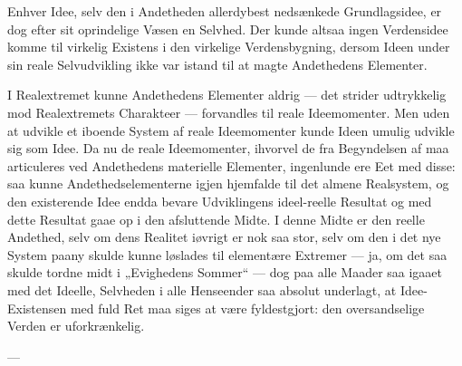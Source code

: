 \documentclass[12pt]{book}
\begin{document}
Enhver Idee, selv den i Andetheden allerdybest nedsænkede Grundlagsidee, er dog efter sit oprindelige Væsen en Selvhed. Der kunde altsaa ingen Verdensidee komme til virkelig Existens i den virkelige Verdensbygning, dersom Ideen under sin reale Selvudvikling ikke var istand til at magte Andethedens Elementer.

I Realextremet kunne Andethedens Elementer aldrig --- det strider udtrykkelig mod Realextremets Charakteer --- forvandles til reale Ideemomenter. Men uden at udvikle et iboende System af reale Ideemomenter kunde Ideen umulig udvikle sig som Idee. Da nu de reale Ideemomenter, ihvorvel de fra Begyndelsen af maa articuleres ved Andethedens materielle Elementer, ingenlunde ere Eet med disse: saa kunne Andethedselementerne igjen hjemfalde til det almene Realsystem, og den existerende Idee endda bevare Udviklingens ideel-reelle Resultat og med dette Resultat gaae op i den afsluttende Midte. I denne Midte er den reelle Andethed, selv om dens Realitet iøvrigt er nok saa stor, selv om den i det nye System paany skulde kunne løslades til elementære Extremer --- ja, om det saa skulde tordne midt i „Evighedens Sommer“ --- dog paa alle Maader saa igaaet med det Ideelle, Selvheden i alle Henseender saa absolut underlagt, at Idee-Existensen med fuld Ret maa siges at være fyldestgjort: den oversandselige Verden er uforkrænkelig.

\begin{center}---\end{center}
\end{document}

